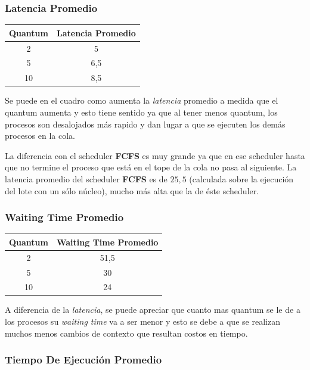 \subsubsection{Latencia Promedio}

\begin{center}
	\begin{tabular}{|c|c|}
		\hline
		\textbf{Quantum} & \textbf{Latencia Promedio} \\
		\hline
		2 & 5 \\
		\hline
		5 & 6,5 \\
		\hline
		10 & 8,5 \\
		\hline
	\end{tabular}
\end{center}

Se puede en el cuadro como aumenta la \emph{latencia} promedio a medida que el quantum aumenta y esto tiene sentido ya que al tener menos quantum, los procesos son desalojados más rapido y dan lugar a que se ejecuten los demás procesos en la cola.

La diferencia con el scheduler \textbf{FCFS} es muy grande ya que en ese scheduler hasta que no termine el proceso que está en el tope de la cola no pasa al siguiente. La latencia promedio del scheduler \textbf{FCFS} es de $25,5$ (calculada sobre la ejecución del lote con un sólo núcleo), mucho más alta que la de éste scheduler.

\subsubsection{Waiting Time Promedio}

\begin{center}
	\begin{tabular}{|c|c|}
		\hline
		\textbf{Quantum} & \textbf{Waiting Time Promedio} \\
		\hline
		2 & 51,5 \\
		\hline
		5 & 30 \\
		\hline
		10 & 24 \\
		\hline
	\end{tabular}
\end{center}

A diferencia de la \emph{latencia}, se puede apreciar que cuanto mas quantum se le de a los procesos su \emph{waiting time} va a ser menor y esto se debe a que se realizan muchos menos cambios de contexto que resultan costos en tiempo.

\subsubsection{Tiempo De Ejecución Promedio}


